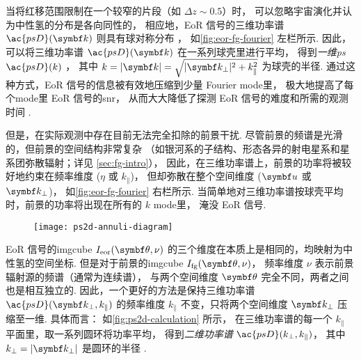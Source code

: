 当将红移范围限制在一个较窄的片段（如 $\Delta z \sim 0.5$）时，
可以忽略宇宙演化并认为中性氢的分布是各向同性的，
相应地，EoR 信号的三维功率谱 $\ac{psD}(\B{k})$ 则具有球对称分布
\cite{morales2004,mcQuinn2006}，
如\autoref{fig:eor-fg-fourier} 左栏所示.
因此，可以将三维功率谱 $\ac{psD}(\B{k})$ 在一系列球壳里进行平均，
得到\emph{一维\ac{ps}} $\ac{psD}(k)$ \cite{morales2004,datta2010}，
其中 $k = |\B{k}| = \sqrt{|\B{k}_{\perp}|^2 + k_{\parallel}^2}$ 为球壳的半径.
通过这种方式，EoR 信号的信息被有效地压缩到少量 Fourier \ac{mode}里，
极大地提高了每个\ac{mode}里 EoR 信号的\ac{snr}，
从而大大降低了探测 EoR 信号的难度和所需的观测时间 \cite{datta2010}.

但是，在实际观测中存在目前无法完全扣除的前景干扰.
尽管前景的频谱是光滑的，但前景的空间结构非常复杂
（如银河系的子结构、形态各异的射电星系和星系团弥散辐射；详见 \autoref{sec:fg-intro}），
因此，在三维功率谱上，前景的功率将被较好地约束在频率维度 ($\eta$ 或 $k_{\parallel}$)，
但却弥散在整个空间维度 ($\B{u}$ 或 $\B{k}_{\perp}$)，
如\autoref{fig:eor-fg-fourier} 右栏所示.
当简单地对三维功率谱按球壳平均时，前景的功率将出现在所有的 $k$ \ac{mode}里，
淹没 EoR 信号.

\begin{figure}[htp]
  \centering
  \texttt{[image: ps2d-annuli-diagram]}
  \label{fig:ps2d-calculation}
\end{figure}

EoR 信号的\ac{imgcube} $I_{\R{eor}}(\B{\theta}, \nu)$
的三个维度在本质上是相同的，均映射为中性氢的空间坐标.
但是对于前景的\ac{imgcube} $I_{\R{fg}}(\B{\theta}, \nu)$，
频率维度 $\nu$ 表示前景辐射源的频谱（通常为连续谱），
与两个空间维度 $\B{\theta}$ 完全不同，两者之间也是相互独立的.
因此，一个更好的方法是保持三维功率谱 $\ac{psD}(\B{k}_{\perp}, k_{\parallel})$
的频率维度 $k_{\parallel}$ 不变，只将两个空间维度 $\B{k}_{\perp}$ 压缩至一维.
具体而言：
如\autoref{fig:ps2d-calculation} 所示，
在三维功率谱的每一个 $k_{\parallel}$ 平面里，取一系列圆环将功率平均，
得到\emph{二维功率谱} $\ac{psD}(k_{\perp}, k_{\parallel})$，
其中 $k_{\perp} = |\B{k}_{\perp}|$ 是圆环的半径 \cite{datta2010,thyagarajan2013}.

